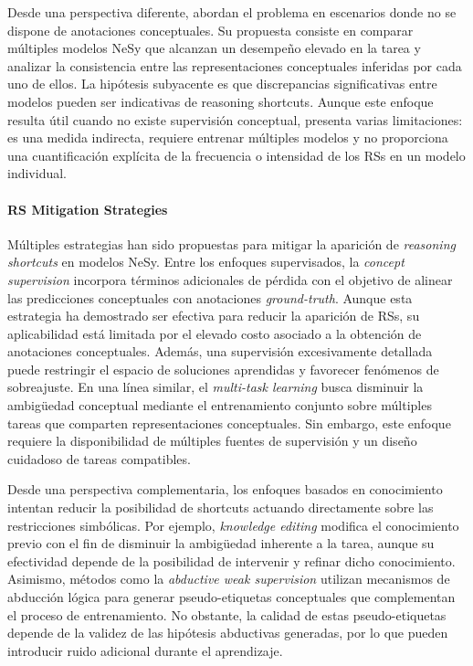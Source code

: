 \documentclass[12pt]{article}
\begin{document}
Desde una perspectiva diferente, \cite{Marconato2024-bears} abordan el problema en escenarios donde no se dispone de anotaciones conceptuales. Su propuesta consiste en comparar múltiples modelos NeSy que alcanzan un desempeño elevado en la tarea y analizar la consistencia entre las representaciones conceptuales inferidas por cada uno de ellos. La hipótesis subyacente es que discrepancias significativas entre modelos pueden ser indicativas de reasoning shortcuts. Aunque este enfoque resulta útil cuando no existe supervisión conceptual, presenta varias limitaciones: es una medida indirecta, requiere entrenar múltiples modelos y no proporciona una cuantificación explícita de la frecuencia o intensidad de los RSs en un modelo individual.

\paragraph{RS Mitigation Strategies}
Múltiples estrategias han sido propuestas para mitigar la aparición de \textit{reasoning shortcuts} en modelos NeSy. Entre los enfoques supervisados, la \textit{concept supervision} \cite{Marconato2023-NotAll} incorpora términos adicionales de pérdida con el objetivo de alinear las predicciones conceptuales con anotaciones \textit{ground-truth}. Aunque esta estrategia ha demostrado ser efectiva para reducir la aparición de RSs, su aplicabilidad está limitada por el elevado costo asociado a la obtención de anotaciones conceptuales. Además, una supervisión excesivamente detallada puede restringir el espacio de soluciones aprendidas y favorecer fenómenos de sobreajuste. En una línea similar, el \textit{multi-task learning} \cite{Marconato2023-NotAll} busca disminuir la ambigüedad conceptual mediante el entrenamiento conjunto sobre múltiples tareas que comparten representaciones conceptuales. Sin embargo, este enfoque requiere la disponibilidad de múltiples fuentes de supervisión y un diseño cuidadoso de tareas compatibles.

Desde una perspectiva complementaria, los enfoques basados en conocimiento intentan reducir la posibilidad de shortcuts actuando directamente sobre las restricciones simbólicas. Por ejemplo, \textit{knowledge editing} \cite{Marconato2023-NotAll} modifica el conocimiento previo con el fin de disminuir la ambigüedad inherente a la tarea, aunque su efectividad depende de la posibilidad de intervenir y refinar dicho conocimiento. Asimismo, métodos como la \textit{abductive weak supervision} \cite{Yang2024} utilizan mecanismos de abducción lógica para generar pseudo-etiquetas conceptuales que complementan el proceso de entrenamiento. No obstante, la calidad de estas pseudo-etiquetas depende de la validez de las hipótesis abductivas generadas, por lo que pueden introducir ruido adicional durante el aprendizaje.
\end{document}
